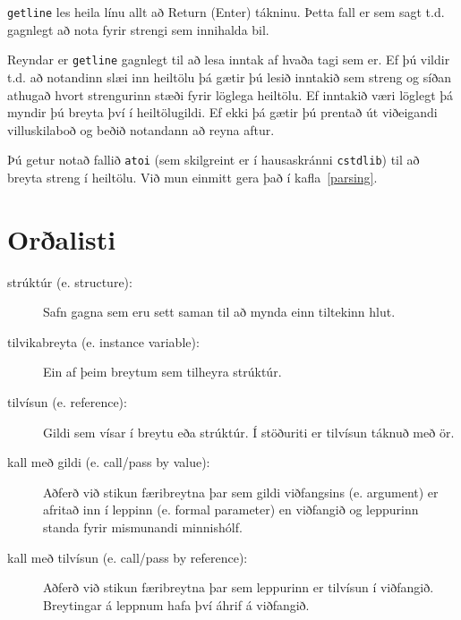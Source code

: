 {\tt getline} les heila línu allt að Return (Enter) tákninu.
Þetta fall er sem sagt t.d. gagnlegt að nota fyrir strengi sem innihalda bil.

Reyndar er {\tt getline} gagnlegt til að lesa inntak af hvaða tagi sem er.
Ef þú vildir t.d. að notandinn slæi inn heiltölu þá gætir þú lesið inntakið sem streng og síðan athugað hvort strengurinn stæði fyrir löglega heiltölu.
Ef inntakið væri löglegt þá myndir þú breyta því í heiltölugildi.
Ef ekki þá gætir þú prentað út viðeigandi villuskilaboð og beðið notandann að reyna aftur.

Þú getur notað fallið {\tt atoi} (sem skilgreint er í hausaskránni {\tt cstdlib}) til að breyta streng í heiltölu. 
Við mun einmitt gera það í kafla~\ref{parsing}.

\section{Orðalisti}

\begin{description}

\item[strúktúr (e. structure):]  Safn gagna sem eru sett saman til að mynda einn tiltekinn hlut.

\item[tilvikabreyta (e. instance variable):]  Ein af þeim breytum sem tilheyra strúktúr.

\item[tilvísun (e. reference):]  Gildi sem vísar í breytu eða strúktúr. Í stöðuriti er tilvísun táknuð með ör.

\item[kall með gildi (e. call/pass by value):]  Aðferð við stikun færibreytna þar sem gildi viðfangsins (e. argument) er afritað inn í leppinn (e. formal parameter) en viðfangið og leppurinn standa fyrir mismunandi minnishólf.

\item[kall með tilvísun (e. call/pass by reference):]  Aðferð við stikun færibreytna þar sem leppurinn er tilvísun í viðfangið.
Breytingar á leppnum hafa því áhrif á viðfangið.


\end{description}

